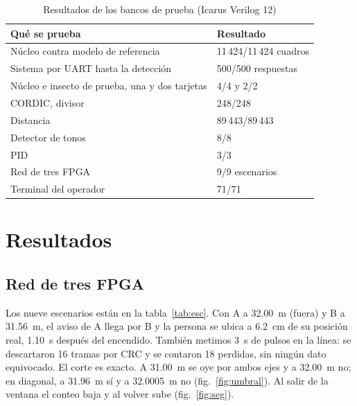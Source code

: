 \documentclass[conference,letterpaper,10pt]{IEEEtran}
\newcommand{\tabfont}{\footnotesize}
\begin{document}
\begin{table}[!tb]
\centering\tabfont
\caption{Resultados de los bancos de prueba (Icarus Verilog 12)}
\label{tab:bancos}
\begin{tabularx}{\columnwidth}{@{}>{\raggedright\arraybackslash}Xl@{}}
\toprule
Qué se prueba & Resultado \\
\midrule
Núcleo contra modelo de referencia & 11\,424/11\,424 cuadros \\
Sistema por UART hasta la detección & 500/500 respuestas \\
Núcleo e insecto de prueba, una y dos tarjetas & 4/4 y 2/2 \\
CORDIC, divisor & 248/248 \\
Distancia & 89\,443/89\,443 \\
Detector de tonos & 8/8 \\
PID & 3/3 \\
Red de tres FPGA & 9/9 escenarios \\
Terminal del operador & 71/71 \\
\bottomrule
\end{tabularx}
\end{table}

\section{Resultados}

\subsection{Red de tres FPGA}

Los nueve escenarios están en la tabla~\ref{tab:esc}. Con A a 32.00~m (fuera) y B a 31.56~m, el aviso de A llega por B y la persona se
ubica a 6.2~cm de su posición real, 1.10~s después del encendido. También metimos 3~s de pulsos en la línea: se descartaron 16 tramas por
CRC y se contaron 18 perdidas, sin ningún dato equivocado. El corte es exacto. A 31.00~m se oye por ambos ejes y a 32.00~m no; en
diagonal, a 31.96~m sí y a 32.0005~m no (fig.~\ref{fig:umbral}). Al salir de la ventana el conteo baja y al volver sube
(fig.~\ref{fig:seg}).
\end{document}
